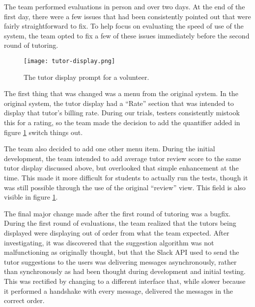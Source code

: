 The team performed evaluations in person and over two days.  At the end of
the first day, there were a few issues that had been consistently pointed out
that were fairly straightforward to fix.  To help focus on evaluating the speed
of use of the system, the team opted to fix a few of these issues immediately
before the second round of tutoring. 

\begin{figure}
  \caption{The tutor display prompt for a volunteer.} \label{fig:tutor_display}
  \centering
    \texttt{[image: tutor-display.png]}
\end{figure}

The first thing that was changed was a menu from the original system.  In the
original system, the tutor display had a ``Rate'' section that was intended to
display that tutor's billing rate.  During our trials, testers consistently
mistook this for a rating, so the team made the decision to add the quantifier
added in figure \ref{fig:tutor_display} switch things out.

The team also decided to add one other menu item. During the initial
development, the team intended to add average tutor review score to the same
tutor display discussed above, but overlooked that simple enhancement at the
time.  This made it more difficult for students to actually run the tests,
though it was still possible through the use of the original ``review'' view.
This field is also visible in figure \ref{fig:tutor_display}.

The final major change made after the first round of tutoring was a bugfix.
During the first round of evaluations, the team realized that the tutors being
displayed were displaying out of order from what the team expected.  After
investigating, it was discovered that the suggestion algorithm was not
malfunctioning as originally thought, but that the Slack API used to send the
tutor suggestions to the users was delivering messages asynchronously, rather
than synchronously as had been thought during development and initial testing.
This was rectified by changing to a different interface that, while slower
because it performed a handshake with every message, delivered the messages in
the correct order.  

